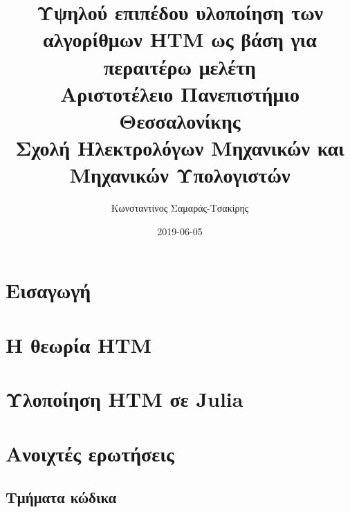 \documentclass[a4paper,11pt,twoside]{report}
\title{
{Υψηλού επιπέδου υλοποίηση των αλγορίθμων HTM ως βάση για περαιτέρω μελέτη}\\
{\large Αριστοτέλειο Πανεπιστήμιο Θεσσαλονίκης}\\
{\large Σχολή Ηλεκτρολόγων Μηχανικών και Μηχανικών Υπολογιστών}
}
\author{Κωνσταντίνος Σαμαράς-Τσακίρης}
\date{2019-06-05}
\begin{document}
\maketitle
%

\tableofcontents{}

\chapter{Εισαγωγή}
%

\chapter{Η θεωρία HTM}
%

\chapter{Υλοποίηση HTM σε Julia}


\chapter{Ανοιχτές ερωτήσεις}
%

\printbibliography

\begin{appendices}
\chapter{Τμήματα κώδικα}

\end{appendices}
\end{document}
